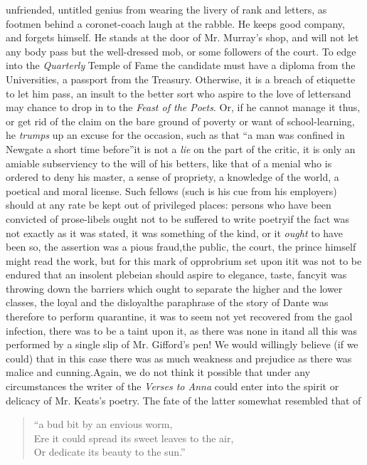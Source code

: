 unfriended, untitled genius from wearing the livery of rank and
letters, as footmen behind a coronet-coach laugh at the rabble. He
keeps good company, and forgets himself. He stands at the door of
Mr. Murray's shop, and will not let any body pass but the
well-dressed mob, or some followers of the court. To edge into the
\emph{Quarterly} Temple of Fame the candidate must have a diploma
from the Universities, a passport from the Treasury. Otherwise, it
is a breach of etiquette to let him pass, an insult to the better
sort who aspire to the love of letters\textemdash and may chance
to drop in to the \emph{Feast of the Poets}. Or, if he cannot
manage it thus, or get rid of the claim on the bare ground of
poverty or want of school-learning, he \emph{trumps} up an excuse
for the occasion, such as that ``a man was confined in Newgate a
short time before''\textemdash it is not a \emph{lie} on the part
of the critic, it is only an amiable subserviency to the will of
his betters, like that of a menial who is ordered to deny his
master, a sense of propriety, a knowledge of the world, a poetical
and moral license. Such fellows (such is his cue from his
employers) should at any rate be kept out of privileged places:
persons who have been convicted of prose-libels ought not to be
suffered to write poetry\textemdash if the fact was not exactly as
it was stated, it was something of the kind, or it \emph{ought} to
have been so, the assertion was a pious fraud,\textemdash the
public, the court, the prince himself might read the work, but for
this mark of opprobrium set upon it\textemdash it was not to be
endured that an insolent plebeian should aspire to elegance,
taste, fancy\textemdash it was throwing down the barriers which
ought to separate the higher and the lower classes, the loyal and
the disloyal\textemdash the paraphrase of the story of Dante was
therefore to perform quarantine, it was to seem not yet recovered
from the gaol infection, there was to be a taint upon it, as there
was none in it\textemdash and all this was performed by a single
slip of Mr. Gifford's pen! We would willingly believe (if we
could) that in this case there was as much weakness and prejudice
as there was malice and cunning.\textemdash Again, we do not think
it possible that under any circumstances the writer of the
\emph{Verses to Anna} could enter into the spirit or delicacy of
Mr. Keats's poetry. The fate of the latter somewhat resembled that
of
\begin{verse}
   ``a bud bit by an envious worm, \\
  Ere it could spread its sweet leaves to the air, \\
  Or dedicate its beauty to the sun.''

\end{verse}
